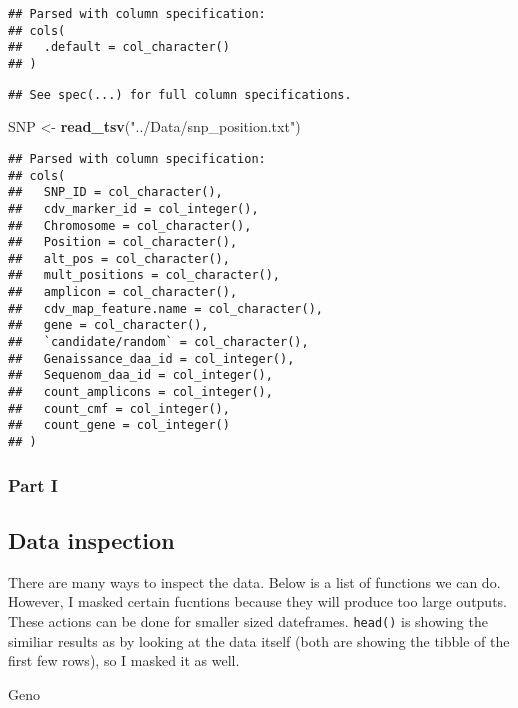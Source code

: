 \documentclass[]{article}
\newenvironment{Shaded}{\begin{snugshade}}{\end{snugshade}}
\newcommand{\KeywordTok}[1]{\textcolor[rgb]{0.13,0.29,0.53}{\textbf{#1}}}
\newcommand{\StringTok}[1]{\textcolor[rgb]{0.31,0.60,0.02}{#1}}
\newcommand{\NormalTok}[1]{#1}
\begin{document}
\begin{verbatim}
## Parsed with column specification:
## cols(
##   .default = col_character()
## )
\end{verbatim}

\begin{verbatim}
## See spec(...) for full column specifications.
\end{verbatim}

\begin{Shaded}
\begin{Highlighting}[]
\NormalTok{SNP <-}\StringTok{ }\KeywordTok{read_tsv}\NormalTok{(}\StringTok{"../Data/snp_position.txt"}\NormalTok{)}
\end{Highlighting}
\end{Shaded}

\begin{verbatim}
## Parsed with column specification:
## cols(
##   SNP_ID = col_character(),
##   cdv_marker_id = col_integer(),
##   Chromosome = col_character(),
##   Position = col_character(),
##   alt_pos = col_character(),
##   mult_positions = col_character(),
##   amplicon = col_character(),
##   cdv_map_feature.name = col_character(),
##   gene = col_character(),
##   `candidate/random` = col_character(),
##   Genaissance_daa_id = col_integer(),
##   Sequenom_daa_id = col_integer(),
##   count_amplicons = col_integer(),
##   count_cmf = col_integer(),
##   count_gene = col_integer()
## )
\end{verbatim}

\subsubsection{Part I}\label{part-i}

\subsection{Data inspection}\label{data-inspection}

There are many ways to inspect the data. Below is a list of functions we
can do. However, I masked certain fucntions because they will produce
too large outputs. These actions can be done for smaller sized
dateframes. \texttt{head()} is showing the similiar results as by
looking at the data itself (both are showing the tibble of the first few
rows), so I masked it as well.

\begin{Shaded}
\begin{Highlighting}[]
\NormalTok{Geno}
\end{Highlighting}
\end{Shaded}
\end{document}
